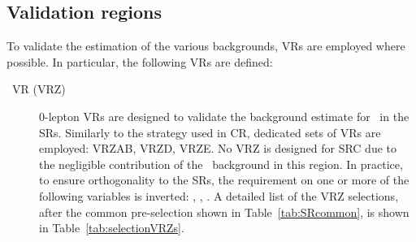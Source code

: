 

		\subsection{Validation regions}

			To validate the estimation of the various backgrounds, \acp{VR} are employed where possible. In particular, the following \acp{VR} are defined:

			\begin{description}

				\item [\Zjets\ VR (VRZ)] $0$-lepton \acp{VR} are designed to validate the background estimate for \Zjets\ in the \acp{SR}. Similarly to the strategy used in \ac{CR}, dedicated sets of \acp{VR} are employed: VRZAB, VRZD, VRZE. No VRZ is designed for SRC due to the negligible contribution of the \Zboson\ background in this region. In practice, to ensure orthogonality to the \acp{SR}, the requirement on one or more of the following variables is inverted: \drbjetbjet, \mantikttwelvezero, \mantikteightzero. A detailed list of the VRZ selections, after the common pre-selection shown in Table~\ref{tab:SRcommon}, is shown in Table~\ref{tab:selectionVRZs}.


\end{description}
